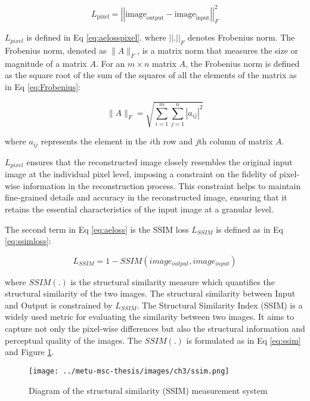 \begin{equation}\label{eq:aelosspixel}
    L_{\text{pixel}} = \left\lvert \left\lvert\text{image}_{\text{output}} - \text{image}_{\text{input}} \right\rvert \right\rvert _{F}^{2}
\end{equation}

$L_{pixel}$ is defined in Eq \ref{eq:aelosspixel}. where $\left\lvert \left\lvert\text{.} \right\rvert \right\rvert _{F}$ denotes Frobenius norm. The Frobenius norm, denoted as $\|A\|_F$, is a matrix norm that measures the size or magnitude of a matrix $A$. For an $m \times n$ matrix $A$, the Frobenius norm is defined as the square root of the sum of the squares of all the elements of the matrix as in Eq \ref{eq:Frobenius}:

\begin{equation}\label{eq:Frobenius}
    \|A\|_F = \sqrt{\sum_{i=1}^{m} \sum_{j=1}^{n} |a_{ij}|^2}
\end{equation}

where $a_{ij}$ represents the element in the $i$th row and $j$th column of matrix $A$.

$L_{pixel}$ ensures that the reconstructed image closely resembles the original input image at the individual pixel level, imposing a constraint on the fidelity of pixel-wise information in the reconstruction process. This constraint helps to maintain fine-grained details and accuracy in the reconstructed image, ensuring that it retains the essential characteristics of the input image at a granular level. 

The second term in Eq \ref{eq:aeloss} is the SSIM loss $L_{SSIM}$ is defined as in Eq \ref{eq:ssimloss}:

\begin{equation}\label{eq:ssimloss}
    L_{SSIM} = 1- SSIM(image_{output},image_{input})
\end{equation}

where $SSIM(.)$ is the structural similarity measure \cite{ma2015perceptual} which quantifies the structural similarity of the two images. The structural similarity between Input and Output is constrained by
$L_{SSIM}$. The Structural Similarity Index (SSIM) is a widely used metric for evaluating the similarity between two images. It aims to capture not only the pixel-wise differences but also the structural information and perceptual quality of the images. The $SSIM(.)$ is formulated as in Eq \ref{eq:ssim} and Figure \ref{fig:ch3:ssim}.

\begin{figure}[htbp]
    \centering
    \texttt{[image: ../metu-msc-thesis/images/ch3/ssim.png]}
    \caption{Diagram of the structural similarity (SSIM) measurement system \cite{ma2015perceptual}}
    \label{fig:ch3:ssim}
\end{figure}

